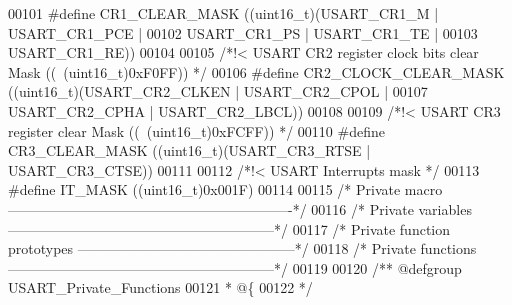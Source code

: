 \begin{DoxyCode}
00101 \textcolor{preprocessor}{#}\textcolor{preprocessor}{define} \textcolor{preprocessor}{CR1\_CLEAR\_MASK}            \textcolor{preprocessor}{(}\textcolor{preprocessor}{(}\textcolor{preprocessor}{uint16\_t}\textcolor{preprocessor}{)}\textcolor{preprocessor}{(}USART_CR1_M \textcolor{preprocessor}{|} USART_CR1_PCE \textcolor{preprocessor}{|}
00102                                               USART_CR1_PS \textcolor{preprocessor}{|} USART_CR1_TE \textcolor{preprocessor}{|}
00103                                               USART_CR1_RE\textcolor{preprocessor}{)}\textcolor{preprocessor}{)}
00104 
00105 \textcolor{comment}{/*!< USART CR2 register clock bits clear Mask ((~(uint16\_t)0xF0FF)) */}
00106 \textcolor{preprocessor}{#}\textcolor{preprocessor}{define} \textcolor{preprocessor}{CR2\_CLOCK\_CLEAR\_MASK}      \textcolor{preprocessor}{(}\textcolor{preprocessor}{(}\textcolor{preprocessor}{uint16\_t}\textcolor{preprocessor}{)}\textcolor{preprocessor}{(}USART_CR2_CLKEN \textcolor{preprocessor}{|} 
      USART_CR2_CPOL \textcolor{preprocessor}{|}
00107                                               USART_CR2_CPHA \textcolor{preprocessor}{|} 
      USART_CR2_LBCL\textcolor{preprocessor}{)}\textcolor{preprocessor}{)}
00108 
00109 \textcolor{comment}{/*!< USART CR3 register clear Mask ((~(uint16\_t)0xFCFF)) */}
00110 \textcolor{preprocessor}{#}\textcolor{preprocessor}{define} \textcolor{preprocessor}{CR3\_CLEAR\_MASK}            \textcolor{preprocessor}{(}\textcolor{preprocessor}{(}\textcolor{preprocessor}{uint16\_t}\textcolor{preprocessor}{)}\textcolor{preprocessor}{(}USART_CR3_RTSE \textcolor{preprocessor}{|} 
      USART_CR3_CTSE\textcolor{preprocessor}{)}\textcolor{preprocessor}{)}
00111 
00112 \textcolor{comment}{/*!< USART Interrupts mask */}
00113 \textcolor{preprocessor}{#}\textcolor{preprocessor}{define} \textcolor{preprocessor}{IT\_MASK}                   \textcolor{preprocessor}{(}\textcolor{preprocessor}{(}\textcolor{preprocessor}{uint16\_t}\textcolor{preprocessor}{)}0x001F\textcolor{preprocessor}{)}
00114 
00115 \textcolor{comment}{/* Private macro -------------------------------------------------------------*/}
00116 \textcolor{comment}{/* Private variables ---------------------------------------------------------*/}
00117 \textcolor{comment}{/* Private function prototypes -----------------------------------------------*/}
00118 \textcolor{comment}{/* Private functions ---------------------------------------------------------*/}
00119 
00120 \textcolor{comment}{/** @defgroup USART\_Private\_Functions}
00121 \textcolor{comment}{  * @\{}
00122 \textcolor{comment}{  */}

\end{DoxyCode}
